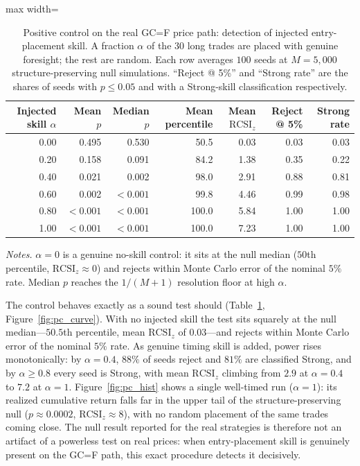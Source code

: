 \documentclass[preprint,12pt]{elsarticle}
\theoremstyle{definition}
\begin{document}
\begin{table}[H]
\centering
\caption{Positive control on the real GC=F price path: detection of injected entry-placement skill. A fraction $\alpha$ of the $30$ long trades are placed with genuine foresight; the rest are random. Each row averages $100$ seeds at $M=5{,}000$ structure-preserving null simulations. ``Reject @ 5\%'' and ``Strong rate'' are the shares of seeds with $p\le0.05$ and with a Strong-skill classification respectively.}
\label{tab:positive_control}
{\small
\renewcommand{\arraystretch}{1.12}
\begin{adjustbox}{max width=\textwidth}
\begin{tabular}{@{}rrrrrrr@{}}
\toprule
Injected skill $\alpha$ & Mean $p$ & Median $p$ & Mean percentile & Mean $\mathrm{RCSI}_z$ & Reject @ 5\% & Strong rate \\
\midrule
0.00 & 0.495 & 0.530 & \phantom{0}50.5 & 0.03 & 0.03 & 0.03 \\
0.20 & 0.158 & 0.091 & \phantom{0}84.2 & 1.38 & 0.35 & 0.22 \\
0.40 & 0.021 & 0.002 & \phantom{0}98.0 & 2.91 & 0.88 & 0.81 \\
0.60 & 0.002 & $<0.001$ & \phantom{0}99.8 & 4.46 & 0.99 & 0.98 \\
0.80 & $<0.001$ & $<0.001$ & 100.0 & 5.84 & 1.00 & 1.00 \\
1.00 & $<0.001$ & $<0.001$ & 100.0 & 7.23 & 1.00 & 1.00 \\
\bottomrule
\end{tabular}
\end{adjustbox}
}
\par\vspace{0.5em}
\begin{minipage}{0.95\textwidth}
\centering
\footnotesize\emph{Notes.} $\alpha=0$ is a genuine no-skill control: it sits at the null median ($50$th percentile, $\mathrm{RCSI}_z\approx0$) and rejects within Monte Carlo error of the nominal $5\%$ rate. Median $p$ reaches the $1/(M+1)$ resolution floor at high $\alpha$.
\end{minipage}
\end{table}

The control behaves exactly as a sound test should (Table~\ref{tab:positive_control}, Figure~\ref{fig:pc_curve}). With no injected skill the test sits squarely at the null median---$50.5$th percentile, mean $\mathrm{RCSI}_z$ of $0.03$---and rejects within Monte Carlo error of the nominal $5\%$ rate. As genuine timing skill is added, power rises monotonically: by $\alpha=0.4$, $88\%$ of seeds reject and $81\%$ are classified Strong, and by $\alpha\ge0.8$ every seed is Strong, with mean $\mathrm{RCSI}_z$ climbing from $2.9$ at $\alpha=0.4$ to $7.2$ at $\alpha=1$. Figure~\ref{fig:pc_hist} shows a single well-timed run ($\alpha=1$): its realized cumulative return falls far in the upper tail of the structure-preserving null ($p\approx0.0002$, $\mathrm{RCSI}_z\approx8$), with no random placement of the same trades coming close. The null result reported for the real strategies is therefore not an artifact of a powerless test on real prices: when entry-placement skill is genuinely present on the GC=F path, this exact procedure detects it decisively.
\end{document}
